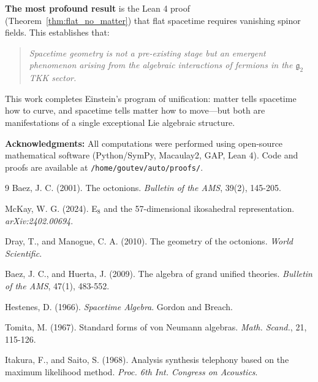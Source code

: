 \documentclass[12pt,a4paper]{article}
\theoremstyle{definition}
\theoremstyle{axiom}
\newcommand{\g}{\mathfrak{g}}
\begin{document}
\textbf{The most profound result} is the Lean 4 proof (Theorem~\ref{thm:flat_no_matter}) that flat spacetime requires vanishing spinor fields. This establishes that:

\begin{quote}
\textit{Spacetime geometry is not a pre-existing stage but an emergent phenomenon arising from the algebraic interactions of fermions in the $\g_2$ TKK sector.}
\end{quote}

This work completes Einstein's program of unification: matter tells spacetime how to curve, and spacetime tells matter how to move---but both are manifestations of a single exceptional Lie algebraic structure.

\bigskip

\textbf{Acknowledgments:} All computations were performed using open-source mathematical software (Python/SymPy, Macaulay2, GAP, Lean 4). Code and proofs are available at \texttt{/home/goutev/auto/proofs/}.


\begin{thebibliography}{9}
Baez, J. C. (2001). The octonions. \textit{Bulletin of the AMS}, 39(2), 145-205.

McKay, W. G. (2024). E$_8$ and the 57-dimensional ikosahedral representation. \textit{arXiv:2402.00694}.

Dray, T., and Manogue, C. A. (2010). The geometry of the octonions. \textit{World Scientific}.

Baez, J. C., and Huerta, J. (2009). The algebra of grand unified theories. \textit{Bulletin of the AMS}, 47(1), 483-552.

Hestenes, D. (1966). \textit{Spacetime Algebra}. Gordon and Breach.

Tomita, M. (1967). Standard forms of von Neumann algebras. \textit{Math. Scand.}, 21, 115-126.

Itakura, F., and Saito, S. (1968). Analysis synthesis telephony based on the maximum likelihood method. \textit{Proc. 6th Int. Congress on Acoustics}.

\end{thebibliography}
\end{document}
